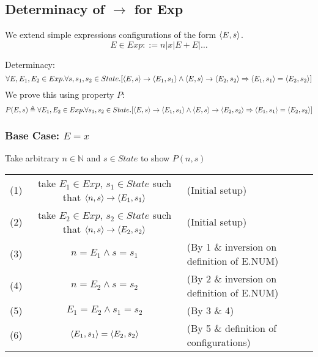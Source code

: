 \documentclass{report}
\begin{document}
\subsection*{Determinacy of $\to$ for Exp}
We extend simple expressions configurations of the form $\langle E, s \rangle$.
\[E \in Exp ::= n | x | E + E | \dots\]

Determinacy:
\[\forall E,E_1,E_2 \in Exp . \forall s, s_1, s_2 \in State . [\langle E, s \rangle \to \langle E_1, s_1 \rangle \land \langle E, s \rangle \to \langle E_2, s_2 \rangle \Rightarrow \langle E_1, s_1 \rangle = \langle E_2, s_2 \rangle]\]
We prove this using property $P$:
\[P(E,s) \triangleq \forall E_1,E_2 \in Exp . \forall s_1, s_2 \in State . [\langle E, s \rangle \to \langle E_1, s_1 \rangle \land \langle E, s \rangle \to \langle E_2, s_2 \rangle \Rightarrow \langle E_1, s_1 \rangle = \langle E_2, s_2 \rangle]\]
\subsubsection*{Base Case: $E = x$}
Take arbitrary $n \in \mathbb{N}$ and $s \in State$ to show $P(n,s)$
\begin{center}
	\begin{tabular}{r c l}
		(1) & take $E_1 \in Exp$, $s_1 \in State$ such that $\langle n, s \rangle \to \langle E_1, s_1 \rangle$ & (Initial setup)                            \\
		(2) & take $E_2 \in Exp$, $s_2 \in State$ such that $\langle n, s \rangle \to \langle E_2, s_2 \rangle$ & (Initial setup)                            \\
		(3) & $n = E_1 \land s = s_1$                                                             & (By 1 \& inversion on definition of E.NUM) \\
		(4) & $n = E_2 \land s = s_2$                                                             & (By 2 \& inversion on definition of E.NUM) \\
		(5) & $E_1 = E_2 \land s_1 = s_2$                                                         & (By 3 \& 4)                                \\
		(6) & $\langle E_1, s_1 \rangle = \langle E_2, s_2 \rangle$                                             & (By 5 \& definition of configurations)     \\
	\end{tabular}
\end{center}
\end{document}
